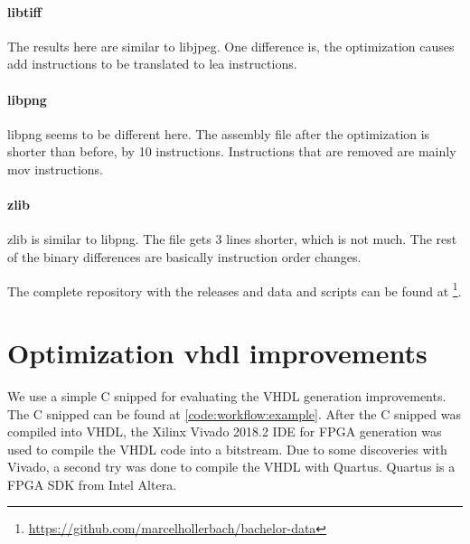 \paragraph{libtiff} The results here are similar to libjpeg. One difference is, the optimization causes add instructions to be translated to lea instructions. 

\paragraph{libpng} libpng seems to be different here. The assembly file after the optimization is shorter than before, by 10 instructions. Instructions that are removed are mainly mov instructions.

\paragraph{zlib} zlib is similar to libpng. The file gets 3 lines shorter, which is not much. The rest of the binary differences are basically instruction order changes.

The complete repository with the releases and data and scripts can be found at \footnote{\url{https://github.com/marcelhollerbach/bachelor-data}}.

\section{Optimization vhdl improvements}



We use a simple C snipped for evaluating the VHDL generation improvements. The C snipped can be found at \autoref{code:workflow:example}. After the C snipped was compiled into VHDL, the Xilinx Vivado 2018.2 IDE for FPGA generation was used to compile the VHDL code into a bitstream. Due to some discoveries with Vivado, a second try was done to compile the VHDL with Quartus. Quartus is a FPGA SDK from Intel Altera.

